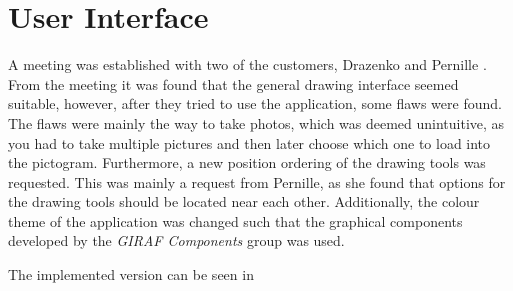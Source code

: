 \section{User Interface}
A meeting was established with two of the customers, Drazenko and Pernille \citep{misc:drazenko, misc:pernille}.
From the meeting it was found that the general drawing interface seemed suitable, however, after they tried to use the application, some flaws were found.
The flaws were mainly the way to take photos, which was deemed unintuitive, as you had to take multiple pictures and then later choose which one to load into the pictogram.
Furthermore, a new position ordering of the drawing tools was requested.
This was mainly a request from Pernille, as she found that options for the drawing tools should be located near each other.
Additionally, the colour theme of the application was changed such that the graphical components developed by the \textit{GIRAF Components} group was used.

The implemented version can be seen in 


